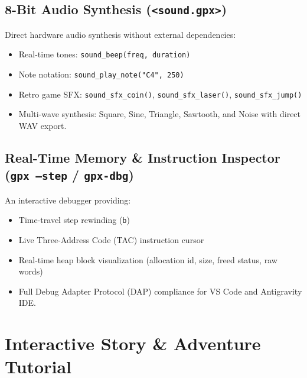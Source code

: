 \documentclass[11pt,a4paper]{report}
\begin{document}
\section{8-Bit Audio Synthesis (\texttt{<sound.gpx>})}
Direct hardware audio synthesis without external dependencies:
\begin{itemize}
    \item Real-time tones: \texttt{sound\_beep(freq, duration)}
    \item Note notation: \texttt{sound\_play\_note("C4", 250)}
    \item Retro game SFX: \texttt{sound\_sfx\_coin()}, \texttt{sound\_sfx\_laser()}, \texttt{sound\_sfx\_jump()}
    \item Multi-wave synthesis: Square, Sine, Triangle, Sawtooth, and Noise with direct WAV export.
\end{itemize}

\section{Real-Time Memory \& Instruction Inspector (\texttt{gpx --step} / \texttt{gpx-dbg})}
An interactive debugger providing:
\begin{itemize}
    \item Time-travel step rewinding (\texttt{b})
    \item Live Three-Address Code (TAC) instruction cursor
    \item Real-time heap block visualization (allocation id, size, freed status, raw words)
    \item Full Debug Adapter Protocol (DAP) compliance for VS Code and Antigravity IDE.
\end{itemize}

\chapter{Interactive Story \& Adventure Tutorial}
\end{document}
